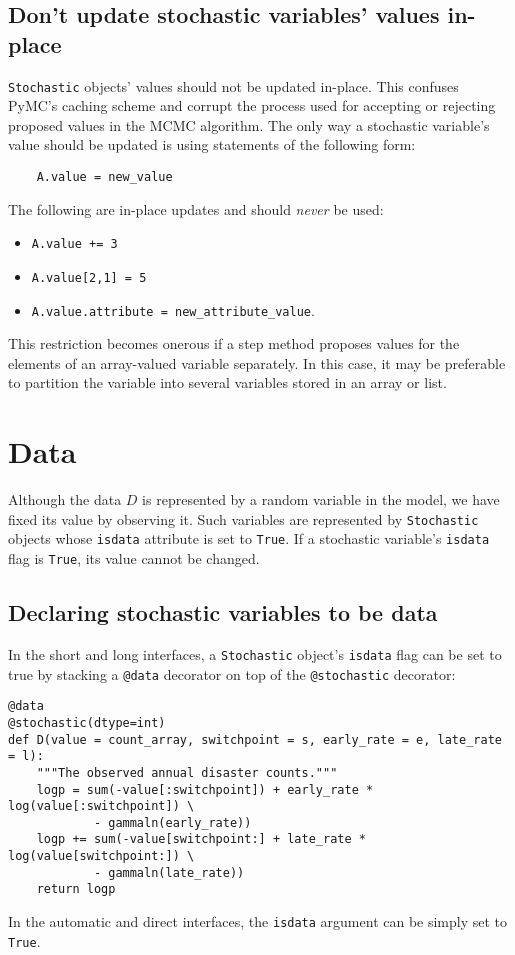\hypertarget{sub:warning}{}
\subsection*{Don't update stochastic variables' values in-place} \label{sub:warning}

\texttt{Stochastic} objects' values should not be updated in-place. This confuses PyMC's caching scheme and corrupt the process used for accepting or rejecting proposed values in the MCMC algorithm. The only way a stochastic variable's value should be updated is using statements of the following form:
\begin{verbatim}
    A.value = new_value
\end{verbatim}
The following are in-place updates and should \emph{never} be used:
\begin{itemize}
    \item \texttt{A.value += 3}
    \item \texttt{A.value[2,1] = 5}
    \item \texttt{A.value.attribute = new_attribute_value}.
\end{itemize}

This restriction becomes onerous if a step method proposes values for the elements of an array-valued variable separately. In this case, it may be preferable to partition the variable into several variables stored in an array or list.


\hypertarget{data}{}
\section*{Data} \label{data}

Although the data $D$ is represented by a random variable in the model, we have fixed its value by observing it. Such variables are represented by \texttt{Stochastic} objects whose \texttt{isdata} attribute is set to \texttt{True}. If a stochastic variable's \texttt{isdata} flag is \texttt{True}, its value cannot be changed.

\subsection*{Declaring stochastic variables to be data}

In the short and long interfaces, a \texttt{Stochastic} object's \texttt{isdata} flag can be set to true by stacking a \texttt{@data} decorator on top of the \texttt{@stochastic} decorator:
\begin{verbatim}
@data
@stochastic(dtype=int)
def D(value = count_array, switchpoint = s, early_rate = e, late_rate = l):
    """The observed annual disaster counts."""
    logp = sum(-value[:switchpoint]) + early_rate * log(value[:switchpoint]) \
            - gammaln(early_rate))
    logp += sum(-value[switchpoint:] + late_rate * log(value[switchpoint:]) \
            - gammaln(late_rate))
    return logp
\end{verbatim}
In the automatic and direct interfaces, the \texttt{isdata} argument can be simply set to \texttt{True}.


